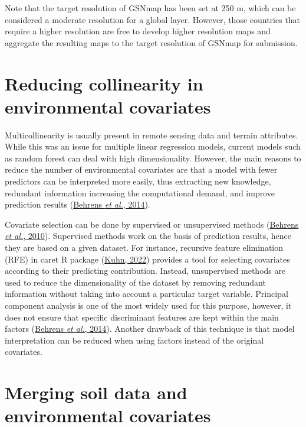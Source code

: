 \documentclass[
  10pt,
  b5paper,
  oneside]{book}
\begin{document}
Note that the target resolution of GSNmap has been set at 250 m, which can be considered a moderate resolution for a global layer. However, those countries that require a higher resolution are free to develop higher resolution maps and aggregate the resulting maps to the target resolution of GSNmap for submission.

\hypertarget{reducing-collinearity-in-environmental-covariates}{%
\section{Reducing collinearity in environmental covariates}\label{reducing-collinearity-in-environmental-covariates}}

Multicollinearity is usually present in remote sensing data and terrain attributes. While this was an issue for multiple linear regression models, current models such as random forest can deal with high dimensionality. However, the main reasons to reduce the number of environmental covariates are that a model with fewer predictors can be interpreted more easily, thus extracting new knowledge, redundant information increasing the computational demand, and improve prediction results (\protect\hyperlink{ref-Behrens2014}{Behrens \emph{et al.}, 2014}).

Covariate selection can be done by supervised or unsupervised methods (\protect\hyperlink{ref-Behrens2010}{Behrens \emph{et al.}, 2010}). Supervised methods work on the basis of prediction results, hence they are based on a given dataset. For instance, recursive feature elimination (RFE) in caret R package (\protect\hyperlink{ref-Kuhn2022}{Kuhn, 2022}) provides a tool for selecting covariates according to their predicting contribution. Instead, unsupervised methods are used to reduce the dimensionality of the dataset by removing redundant information without taking into account a particular target variable. Principal component analysis is one of the most widely used for this purpose, however, it does not ensure that specific discriminant features are kept within the main factors (\protect\hyperlink{ref-Behrens2014}{Behrens \emph{et al.}, 2014}). Another drawback of this technique is that model interpretation can be reduced when using factors instead of the original covariates.

\hypertarget{merging-soil-data-and-environmental-covariates}{%
\section{Merging soil data and environmental covariates}\label{merging-soil-data-and-environmental-covariates}}
\end{document}
